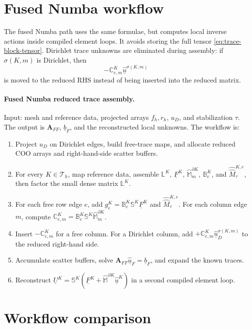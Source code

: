 \documentclass[11pt]{article}
\newcommand{\T}{\mathcal T_h}
\newcommand{\uhat}{\underline{\widehat u}}
\newcommand{\UK}{\underline U^K}
\newcommand{\FK}{\underline F^K}
\newcommand{\LK}{\mathbb L^K}
\newcommand{\SK}{\mathbb S^K}
\newcommand{\B}{\mathbb B}
\newcommand{\C}{\mathbb C}
\newcommand{\Mbb}{\widehat{\mathbb M}}
\newcommand{\Mhh}{\widehat{\widehat M}}
\begin{document}
\section{Fused Numba workflow}

The fused Numba path uses the same formulae, but computes local inverse actions inside compiled element loops. It avoids storing the full tensor \eqref{eq:trace-block-tensor}. Dirichlet trace unknowns are eliminated during assembly: if $\sigma(K,m)$ is Dirichlet, then
\[
    -\C_{e,m}^K\uhat^{\sigma(K,m)}
\]
is moved to the reduced RHS instead of being inserted into the reduced matrix.

\paragraph{Fused Numba reduced trace assembly.}
Input: mesh and reference data, projected arrays $f_h,r_h$, $u_D$, and
stabilization $\tau$. The output is $\mathbf A_{FF}$, $\underline b_F$, and
the reconstructed local unknowns. The workflow is:
\begin{enumerate}[leftmargin=*]
\item Project $u_D$ on Dirichlet edges, build free-trace maps, and allocate
      reduced COO arrays and right-hand-side scatter buffers.
\item For every $K\in\T$, map reference data, assemble $\LK$, $\FK$,
      $\Mbb_m^{\partial K}$, $\B_e^K$, and $\Mhh_\tau^{K,e}$, then factor
      the small dense matrix $\LK$.
\item For each free row edge $e$, add $g_e^K=\B_e^K\SK\FK$ and
      $\Mhh_\tau^{K,e}$. For each column edge $m$, compute
      $\C_{e,m}^K=\B_e^K\SK\Mbb_m^{\partial K}$.
\item Insert $-\C_{e,m}^K$ for a free column. For a Dirichlet column, add
      $+\C_{e,m}^K\uhat_D^{\sigma(K,m)}$ to the reduced right-hand side.
\item Accumulate scatter buffers, solve
      $\mathbf A_{FF}\uhat_F=\underline b_F$, and expand the known traces.
\item Reconstruct $\UK=\SK(\FK+\Mbb^{\partial K}\uhat^K)$ in a second
      compiled element loop.
\end{enumerate}

\section{Workflow comparison}
\end{document}
